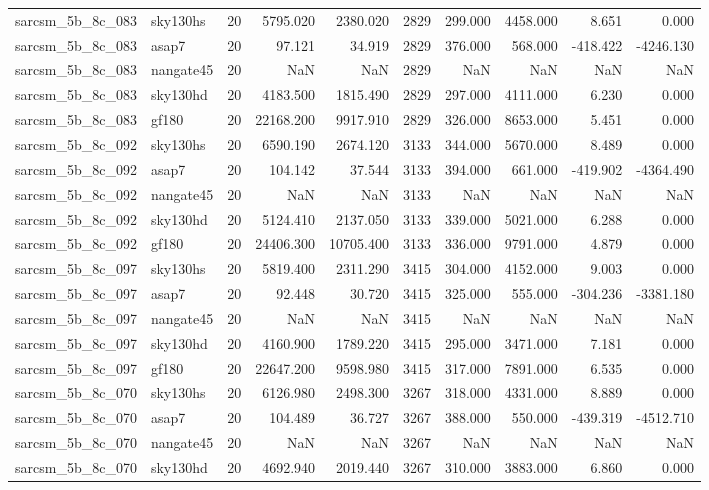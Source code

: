 \documentclass{article}
\begin{document}
\begin{longtable}{llrrrrrrrr}
sarcsm\_5b\_8c\_083 & sky130hs & 20 & 5795.020 & 2380.020 & 2829 & 299.000 & 4458.000 & 8.651 & 0.000 \\
sarcsm\_5b\_8c\_083 & asap7 & 20 & 97.121 & 34.919 & 2829 & 376.000 & 568.000 & -418.422 & -4246.130 \\
sarcsm\_5b\_8c\_083 & nangate45 & 20 & NaN & NaN & 2829 & NaN & NaN & NaN & NaN \\
sarcsm\_5b\_8c\_083 & sky130hd & 20 & 4183.500 & 1815.490 & 2829 & 297.000 & 4111.000 & 6.230 & 0.000 \\
sarcsm\_5b\_8c\_083 & gf180 & 20 & 22168.200 & 9917.910 & 2829 & 326.000 & 8653.000 & 5.451 & 0.000 \\
sarcsm\_5b\_8c\_092 & sky130hs & 20 & 6590.190 & 2674.120 & 3133 & 344.000 & 5670.000 & 8.489 & 0.000 \\
sarcsm\_5b\_8c\_092 & asap7 & 20 & 104.142 & 37.544 & 3133 & 394.000 & 661.000 & -419.902 & -4364.490 \\
sarcsm\_5b\_8c\_092 & nangate45 & 20 & NaN & NaN & 3133 & NaN & NaN & NaN & NaN \\
sarcsm\_5b\_8c\_092 & sky130hd & 20 & 5124.410 & 2137.050 & 3133 & 339.000 & 5021.000 & 6.288 & 0.000 \\
sarcsm\_5b\_8c\_092 & gf180 & 20 & 24406.300 & 10705.400 & 3133 & 336.000 & 9791.000 & 4.879 & 0.000 \\
sarcsm\_5b\_8c\_097 & sky130hs & 20 & 5819.400 & 2311.290 & 3415 & 304.000 & 4152.000 & 9.003 & 0.000 \\
sarcsm\_5b\_8c\_097 & asap7 & 20 & 92.448 & 30.720 & 3415 & 325.000 & 555.000 & -304.236 & -3381.180 \\
sarcsm\_5b\_8c\_097 & nangate45 & 20 & NaN & NaN & 3415 & NaN & NaN & NaN & NaN \\
sarcsm\_5b\_8c\_097 & sky130hd & 20 & 4160.900 & 1789.220 & 3415 & 295.000 & 3471.000 & 7.181 & 0.000 \\
sarcsm\_5b\_8c\_097 & gf180 & 20 & 22647.200 & 9598.980 & 3415 & 317.000 & 7891.000 & 6.535 & 0.000 \\
sarcsm\_5b\_8c\_070 & sky130hs & 20 & 6126.980 & 2498.300 & 3267 & 318.000 & 4331.000 & 8.889 & 0.000 \\
sarcsm\_5b\_8c\_070 & asap7 & 20 & 104.489 & 36.727 & 3267 & 388.000 & 550.000 & -439.319 & -4512.710 \\
sarcsm\_5b\_8c\_070 & nangate45 & 20 & NaN & NaN & 3267 & NaN & NaN & NaN & NaN \\
sarcsm\_5b\_8c\_070 & sky130hd & 20 & 4692.940 & 2019.440 & 3267 & 310.000 & 3883.000 & 6.860 & 0.000 \\

\end{longtable}
\end{document}
